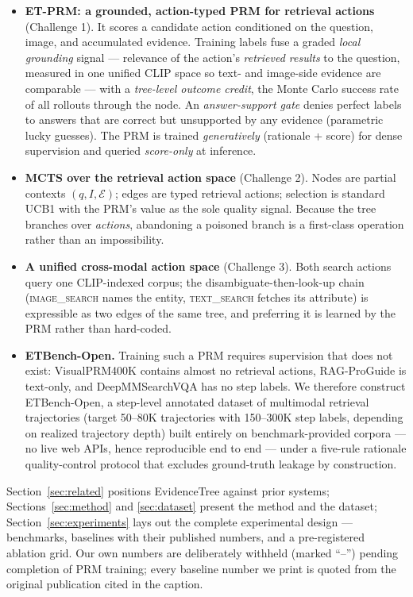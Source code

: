 \documentclass[letterpaper,twocolumn,10pt]{article}
\newcommand{\ours}{EvidenceTree}
\newcommand{\dataset}{ETBench-Open}
\newcommand{\prm}{ET-PRM}
\newcommand{\NA}{--}          %
\begin{document}
\begin{itemize}
\item \textbf{\prm{}: a grounded, action-typed PRM for retrieval actions}
(Challenge 1). It scores a candidate action conditioned on the question,
image, and accumulated evidence. Training labels fuse a graded
\emph{local grounding} signal --- relevance of the action's
\emph{retrieved results} to the question, measured in one unified CLIP
space so text- and image-side evidence are comparable --- with a
\emph{tree-level outcome credit}, the Monte Carlo success rate of all
rollouts through the node. An \emph{answer-support gate} denies perfect
labels to answers that are correct but unsupported by any evidence
(parametric lucky guesses). The PRM is trained \emph{generatively}
(rationale + score) for dense supervision and queried \emph{score-only}
at inference.
\item \textbf{MCTS over the retrieval action space} (Challenge 2). Nodes
are partial contexts $(q, I, \mathcal{E})$; edges are typed retrieval
actions; selection is standard UCB1 with the PRM's value as the sole
quality signal. Because the tree branches over \emph{actions}, abandoning
a poisoned branch is a first-class operation rather than an impossibility.
\item \textbf{A unified cross-modal action space} (Challenge 3). Both
search actions query one CLIP-indexed corpus; the
disambiguate-then-look-up chain (\textsc{image\_search} names the entity,
\textsc{text\_search} fetches its attribute) is expressible as two edges
of the same tree, and preferring it is learned by the PRM rather than
hard-coded.
\item \textbf{\dataset{}.} Training such a PRM requires supervision that
does not exist: VisualPRM400K \cite{visualprm2025} contains almost no
retrieval actions, RAG-ProGuide \cite{zhang2025reasonrag} is text-only,
and DeepMMSearchVQA \cite{deepmmsearch2025} has no step labels. We
therefore construct \dataset{}, a step-level annotated dataset of
multimodal retrieval trajectories (target 50--80K trajectories with
150--300K step labels, depending on realized trajectory depth) built
entirely on benchmark-provided corpora ---
no live web APIs, hence reproducible end to end --- under a five-rule
rationale quality-control protocol that excludes ground-truth leakage by
construction.
\end{itemize}

Section~\ref{sec:related} positions \ours{} against prior systems;
Sections~\ref{sec:method} and \ref{sec:dataset} present the method and the
dataset; Section~\ref{sec:experiments} lays out the complete experimental
design --- benchmarks, baselines with their published numbers, and a
pre-registered ablation grid. Our own numbers are deliberately withheld
(marked ``\NA'') pending completion of PRM training; every baseline number
we print is quoted from the original publication cited in the caption.
\end{document}
